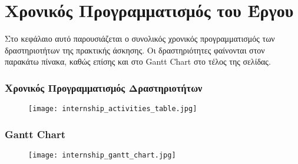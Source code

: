 \chapter*{Χρονικός Προγραμματισμός του Έργου}

Στο κεφάλαιο αυτό παρουσιάζεται ο συνολικός χρονικός προγραμματισμός των δραστηριοτήτων της πρακτικής άσκησης. Οι δραστηριότητες φαίνονται στον παρακάτω πίνακα, καθώς επίσης 
και στο Gantt Chart στο τέλος της σελίδας.\\

\subsection*{Χρονικός Προγραμματισμός Δραστηριοτήτων}
\begin{figure}[h]
    \texttt{[image: internship\_activities\_table.jpg]}
    \centering
\end{figure}

\subsection*{Gantt Chart}
\begin{figure}[h]
    \texttt{[image: internship\_gantt\_chart.jpg]}
    \centering
\end{figure}
